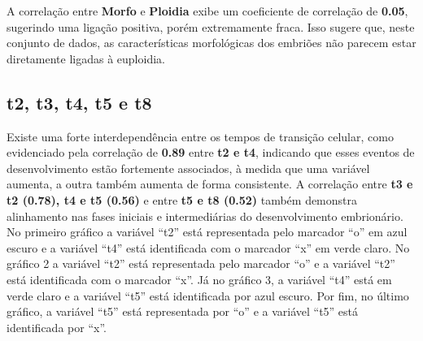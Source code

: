 A correlação entre \textbf{Morfo} e \textbf{Ploidia} exibe um coeficiente de correlação de \textbf{0.05}, sugerindo uma ligação positiva, porém extremamente fraca. Isso sugere que, neste conjunto de dados, as características morfológicas dos embriões não parecem estar diretamente ligadas à euploidia. 

\subsection*{t2, t3, t4, t5 e t8}
Existe uma forte interdependência entre os tempos de transição celular, como evidenciado pela correlação de \textbf{0.89} entre \textbf{t2 e t4}, indicando que esses eventos de desenvolvimento estão fortemente associados, à medida que uma variável aumenta, a outra também aumenta de forma consistente. A correlação entre \textbf{t3 e t2 (0.78), t4 e t5 (0.56)} e entre \textbf{t5 e t8 (0.52)} também demonstra alinhamento nas fases iniciais e intermediárias do desenvolvimento embrionário. No primeiro gráfico a variável “t2” está representada pelo marcador “o” em azul escuro e a variável “t4” está identificada com o marcador “x” em verde claro. No gráfico 2 a variável “t2” está representada pelo marcador “o” e a variável “t2” está identificada com o marcador “x”. Já no gráfico 3, a variável “t4” está em verde claro e a variável “t5” está identificada por azul escuro. Por fim, no último gráfico, a variável “t5” está representada por “o” e a variável “t5” está identificada por “x”.

